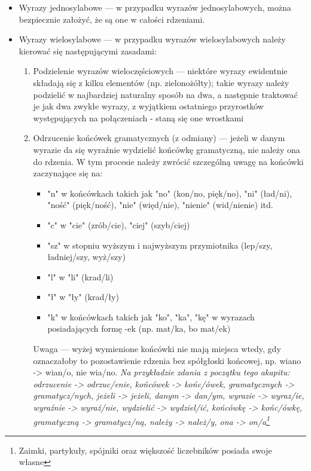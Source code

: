 \documentclass[12p, oneside]{book}
\begin{document}
\begin{itemize}
	\item Wyrazy jednosylabowe --- w przypadku wyrazów jednosylabowych,
		można bezpiecznie założyć, że są one w całości rdzeniami.
	\item Wyrazy wielosylabowe --- w przypadku wyrazów wielosylabowych
		należy kierować się następującymi zasadami:
		\begin{enumerate}
			\item Podzielenie wyrazów wieloczęściowych --- niektóre
				wyrazy ewidentnie składają się z kilku elementów
				(np. zielonożółty); takie wyrazy należy
				podzielić w najbardziej naturalny sposób na dwa,
				a następnie traktować je jak dwa zwykłe wyrazy,
				z wyjątkiem ostatniego przyrostków występujących
				na połączeniach - staną się one wrostkami
			\item Odrzucenie końcówek gramatycznych (z odmiany) ---
				jeżeli w danym wyrazie da się wyraźnie wydzielić
				końcówkę gramatyczną, nie należy ona do rdzenia.
				W tym procesie należy zwrócić szczególną uwagę
				na końcówki zaczynające się na:
				\begin{itemize}
					\item "n" w końcówkach takich jak "no"
						(kon/no, pięk/no), "ni"
						(ład/ni), "ność" (pięk/ność),
						"nie" (więd/nie), "nienie"
						(wid/nienie) itd.
					\item "c" w "cie" (zrób/cie), "ciej"
						(szyb/ciej)
					\item "sz" w stopniu wyższym i
						najwyższym przymiotnika
						(lep/szy, ładniej/szy, wyż/szy)
					\item "l" w "li" (krad/li)
					\item "ł" w "ły" (krad/ły)
					\item "k" w końcówkach takich jak "ko",
						"ka", "kę" w wyrazach
						posiadających formę -ek (np.
						mat/ka, bo mat/ek)
				\end{itemize}
				Uwaga --- wyżej wymienione końcówki nie mają
				miejsca wtedy, gdy oznaczałoby to pozostawienie
				rdzenia bez spółgłoski końcowej, np. wiano ->
				wian/o, nie wia/no.
				\emph{Na przykładzie zdania z początku tego
				akapitu: odrzucenie -> odrzuc/enie, końcówek ->
				końc/ówek, gramatycznych -> gramatycz/nych,
				jeżeli -> jeżeli, danym -> dan/ym, wyrazie ->
				wyraz/ie, wyraźnie -> wyraź/nie, wydzielić ->
				wydziel/ić, końcówkę -> końc/ówkę, gramatyczną
				-> gramatycz/ną, należy -> należ/y, ona ->
				on/a\footnote{Zaimki, partykuły, spójniki oraz
				większość liczebników posiada swoje własne
}}
\end{enumerate}
\end{itemize}
\end{document}
